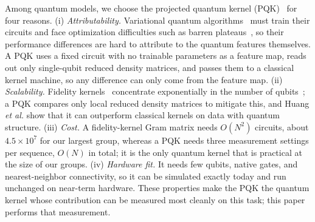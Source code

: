 \documentclass[conference]{IEEEtran}
\begin{document}
Among quantum models, we choose the projected quantum kernel (PQK)~\cite{huang2021power} for four reasons. (i) \emph{Attributability.} Variational quantum algorithms~\cite{cerezo2021vqa} must train their circuits and face optimization difficulties such as barren plateaus~\cite{mcclean2018barren}, so their performance differences are hard to attribute to the quantum features themselves. A PQK uses a fixed circuit with no trainable parameters as a feature map, reads out only single-qubit reduced density matrices, and passes them to a classical kernel machine, so any difference can only come from the feature map. (ii) \emph{Scalability.} Fidelity kernels~\cite{havlicek2019} concentrate exponentially in the number of qubits~\cite{thanasilp2024concentration}; a PQK compares only local reduced density matrices to mitigate this, and Huang \textit{et al.} show that it can outperform classical kernels on data with quantum structure. (iii) \emph{Cost.} A fidelity-kernel Gram matrix needs $O(N^2)$ circuits, about $4.5\times10^7$ for our largest group, whereas a PQK needs three measurement settings per sequence, $O(N)$ in total; it is the only quantum kernel that is practical at the size of our groups. (iv) \emph{Hardware fit.} It needs few qubits, native gates, and nearest-neighbor connectivity, so it can be simulated exactly today and run unchanged on near-term hardware. These properties make the PQK the quantum kernel whose contribution can be measured most cleanly on this task; this paper performs that measurement.
\end{document}
